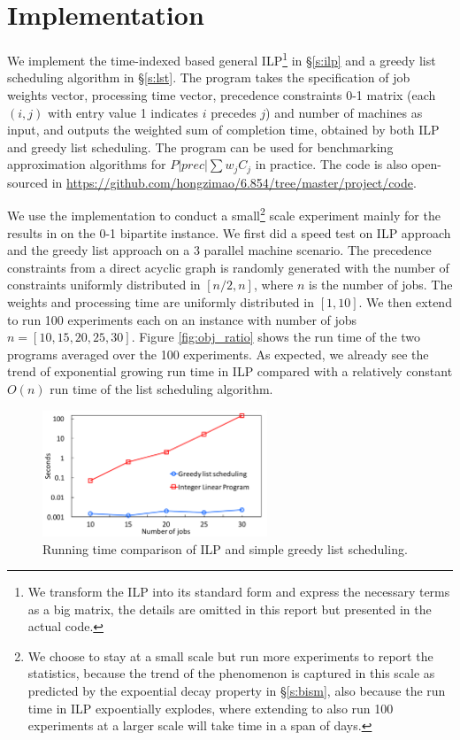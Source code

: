 \section{Implementation} \label{s:impl}
We implement the time-indexed based general ILP\footnote{We transform the ILP into its standard form and express the necessary terms as a big matrix, the details are omitted in this report but presented in the actual code.} in \S\ref{s:ilp} and a greedy list scheduling algorithm in \S\ref{s:lst}. The program takes the specification of job weights vector, processing time vector, precedence constraints 0-1 matrix (each $(i, j)$ with entry value 1 indicates $i$ precedes $j$) and number of machines as input, and outputs the weighted sum of completion time, obtained by both ILP and greedy list scheduling. The program can be used for benchmarking approximation algorithms for $P|prec|\sum w_j C_j$ in practice. The code is also open-sourced in \url{https://github.com/hongzimao/6.854/tree/master/project/code}.

We use the implementation to conduct a small\footnote{We choose to stay at a small scale but run more experiments to report the statistics, because the trend of the phenomenon is captured in this scale as predicted by the expoential decay property in \S\ref{s:bism}, also because the run time in ILP expoentially explodes, where extending to also run 100 experiments at a larger scale will take time in a span of days.} scale experiment mainly for the results in \cite{schulz2011near} on the 0-1 bipartite instance. We first did a speed test on ILP approach and the greedy list approach on a 3 parallel machine scenario. The precedence constraints from a direct acyclic graph is randomly generated with the number of constraints uniformly distributed in $[n/2, n]$, where $n$ is the number of jobs. The weights and processing time are uniformly distributed in $[1, 10]$. We then extend to run 100 experiments each on an instance with number of jobs $n = [10, 15, 20, 25, 30]$. Figure \ref{fig:obj_ratio} shows the run time of the two programs averaged over the 100 experiments. As expected, we already see the trend of exponential growing run time in ILP compared with a relatively constant $O(n)$ run time of the list scheduling algorithm.

\begin{figure}[h]
	\centering
	\includegraphics[width=0.6\textwidth]{figs/runtime.pdf}
	\caption{Running time comparison of ILP and simple greedy list scheduling.}
	\label{fig:runtime}
\end{figure}

